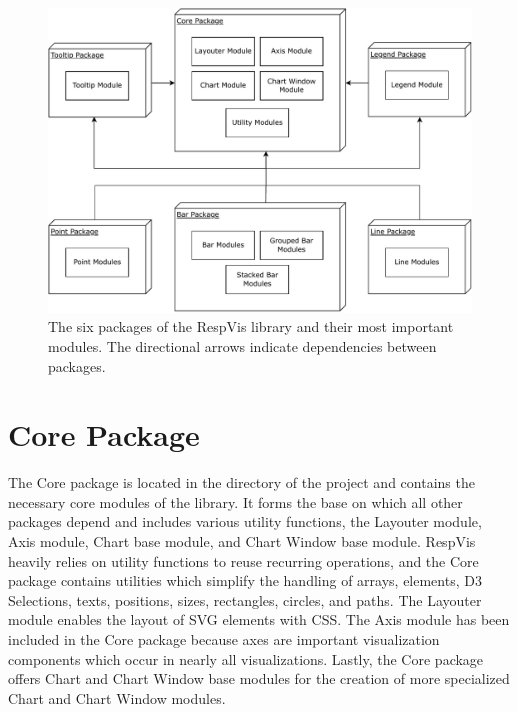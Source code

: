 \begin{figure}[tp]
\centering
\includegraphics[keepaspectratio,width=\linewidth,height=\fullh]
{diagrams/respvis-packages.pdf}
\caption[Packages of RespVis]{
The six packages of the RespVis library and their most important modules. The
directional arrows indicate dependencies between packages.
}
\label{fig:Packages}
\end{figure}







\section{Core Package}

The Core package is located in the  directory of
the project and contains the necessary core modules of the library. It
forms the base on which all other packages depend and includes various
utility functions, the Layouter module, Axis module, Chart base
module, and Chart Window base module. RespVis heavily relies on
utility functions to reuse recurring operations, and the Core package
contains utilities which simplify the handling of arrays, elements, D3
Selections, texts, positions, sizes, rectangles, circles, and paths.
The Layouter module enables the layout of SVG elements with CSS. The
Axis module has been included in the Core package because axes are
important visualization components which occur in nearly all
visualizations. Lastly, the Core package offers Chart and Chart Window
base modules for the creation of more specialized Chart and Chart
Window modules.


